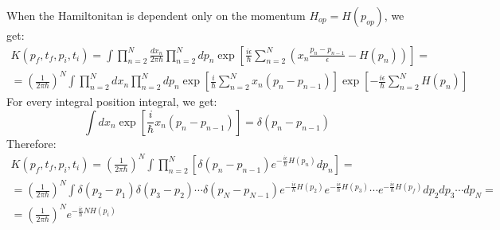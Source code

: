\documentclass{article}
\begin{document}
\newline
When the Hamiltonitan is dependent only on the momentum $H_{op} = H(p_{op})$, we get:
\begin{equation}
\begin{gathered}
    K(p_f, t_f, p_i, t_i) = \int \prod_{n=2}^{N} \frac{dx_n}{2\pi\hbar} \prod_{n=2}^{N} dp_n \exp \left[
        \frac{i\epsilon}{\hbar}
        \sum_{n=2}^{N}
        \left(
            x_n \frac{p_n - p_{n-1}}{\epsilon} - H(p_n)
        \right)
    \right] = 
    \\
    = \left(\frac{1}{2\pi\hbar}\right)^N
    \int
    \prod_{n=2}^{N} dx_n
    \prod_{n=2}^{N} dp_n
    \exp \left[
        \frac{i}{\hbar}
        \sum_{n=2}^{N}
        x_n \left(p_n - p_{n-1}\right)
    \right]
    \exp \left[
        - \frac{i\epsilon}{\hbar}
        \sum_{n=2}^{N} H(p_n)
    \right]
\end{gathered}
\end{equation}
For every integral position integral, we get:
\begin{equation}
    \int dx_n \exp \left[\frac{i}{\hbar}x_n \left(p_n - p_{n-1}\right)\right] = \delta(p_n - p_{n-1})
\end{equation}
Therefore:
\begin{equation}
\begin{gathered}
    K(p_f, t_f, p_i, t_i) = \left(\frac{1}{2\pi\hbar}\right)^N
    \int
    \prod_{n=2}^{N}
    \left[
        \delta(p_n - p_{n-1})
        e^{-\frac{i\epsilon}{\hbar}H(p_n)}
        dp_n
    \right] =
    \\
    = \left(\frac{1}{2\pi\hbar}\right)^N
    \int
        \delta(p_2 - p_1)
        \delta(p_3 - p_2)
        \cdots
        \delta(p_N - p_{N-1})
        e^{-\frac{i\epsilon}{\hbar}H(p_2)}
        e^{-\frac{i\epsilon}{\hbar}H(p_3)}
        \cdots
        e^{-\frac{i\epsilon}{\hbar}H(p_f)}
    dp_2 dp_3 \cdots dp_N =
    \\
    = \left(\frac{1}{2\pi\hbar} \right)^N e^{-\frac{i\epsilon}{\hbar} N H(p_i)}
\end{gathered}
\end{equation}
\newpage
\end{document}
